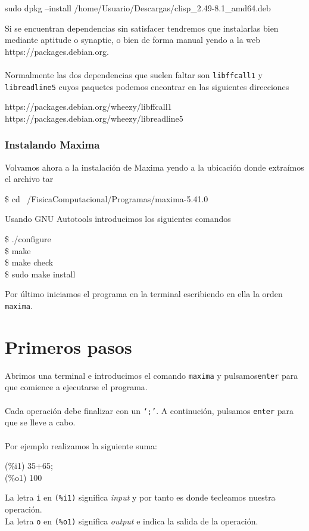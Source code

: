\documentclass[a4paper, 12pt] {article}
\begin{document}
\begin{center}
sudo dpkg --install /home/Usuario/Descargas/clisp\_2.49-8.1\_amd64.deb 
\end{center}
Si se encuentran dependencias sin satisfacer tendremos que instalarlas bien mediante aptitude o synaptic, o bien de forma manual yendo a la web https://packages.debian.org.\\\\
Normalmente las dos dependencias que suelen faltar son \texttt{libffcall1} y \texttt{libreadline5} cuyos paquetes podemos encontrar en las siguientes \linebreak direcciones
\begin{center}
  https://packages.debian.org/wheezy/libffcall1
  https://packages.debian.org/wheezy/libreadline5
\end{center}
\subsubsection{Instalando Maxima}
Volvamos ahora a la instalación de Maxima yendo a la ubicación donde extraímos el archivo tar
\begin{center}
\$ cd ~/FisicaComputacional/Programas/maxima-5.41.0 \\
\end{center}

Usando GNU Autotools introducimos los siguientes comandos
\begin{center}
\$  ./configure\\
\$  make\\
\$  make check\\
\$  sudo make install\\
\end{center}

Por último iniciamos el programa en la terminal escribiendo en ella la orden \texttt{maxima}.

\section{Primeros pasos}
Abrimos una terminal e introducimos el comando \texttt{maxima} y pulsamos\linebreak \texttt{enter} para que comience a ejecutarse el programa.\\\\
Cada operación debe finalizar con un \texttt{`;'}. A continución, pulsamos \texttt{enter} para que se lleve a cabo.\\\\
Por ejemplo realizamos la siguiente suma:
\begin{center}
  (\%i1) 35+65;\\(\%o1) 100
\end{center}
La letra \texttt{i} en \texttt{(\%i1)} significa \textit{input} y por tanto es donde tecleamos nuestra operación.\\
La letra \texttt{o} en \texttt{(\%o1)} significa \textit{output} e indica la salida de la \linebreak operación.
\end{document}
